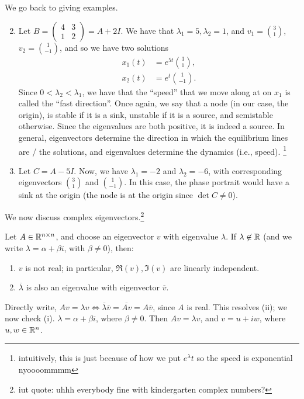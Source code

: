 \noindent We go back to giving examples.
\begin{enumerate}[label=(\alph*)]
    \setcounter{enumi}{1}
    \item Let $B = \begin{pmatrix} 4 & 3 \\ 1 & 2 \end{pmatrix} = A + 2I$. We have that $\lambda_1 = 5, \lambda_2 = 1$, and $v_1 = \binom{3}{1}$, $v_2 = \binom{1}{-1}$, and so we have two solutions
    \begin{align*}
        x_1(t) &= e^{5t} \binom{3}{1}, \\
        x_2(t) &= e^t \binom{1}{-1}.
    \end{align*}
    Since $0 < \lambda_2 < \lambda_1$, we have that the ``speed'' that we move along at on $x_1$ is called the ``fast direction''. Once again, we say that a node (in our case, the origin), is stable if it is a sink, unstable if it is a source, and semistable otherwise. Since the eigenvalues are both positive, it is indeed a source. In general, eigenvectors determine the direction in which the equilibrium lines are / the solutions, and eigenvalues determine the dynamics (i.e., speed). \footnote{intuitively, this is just because of how we put $e^\lambda t$ so the speed is exponential nyoooommmm}
    \item Let $C = A - 5I$. Now, we have $\lambda_1 = -2$ and $\lambda_2 = -6$, with corresponding eigenvectors $\binom{3}{1}$ and $\binom{1}{-1}$. In this case, the phase portrait would have a sink at the origin (the node is at the origin since $\det C \neq 0$).
\end{enumerate}
We now discuss complex eigenvectors.\footnote{iut quote: uhhh everybody fine with kindergarten complex numbers?}
\begin{simplelemma}
    Let $A \in \mathbb R^{n \times n}$, and choose an eigenvector $v$ with eigenvalue $\lambda$. If $\lambda \not\in \mathbb R$ (and we write $\lambda = \alpha + \beta i$, with $\beta \neq 0$), then:
    \begin{enumerate}[label=(\roman*)]
        \item $v$ is not real; in particular, $\Re(v), \Im(v)$ are linearly independent.
        \item $\overline{\lambda}$ is also an eigenvalue with eigenvector $\overline{v}$.
    \end{enumerate}
\end{simplelemma}
\noindent Directly write, $Av = \lambda v \iff \overline{\lambda} \overline{v} = \overline{Av} = A \overline{v}$, since $A$ is real. This resolves (ii); we now check (i). $\lambda = \alpha + \beta i$, where $\beta \neq 0$. Then $Av = \lambda v$, and $v = u + iw$, where $u, w \in \mathbb R^n$.

